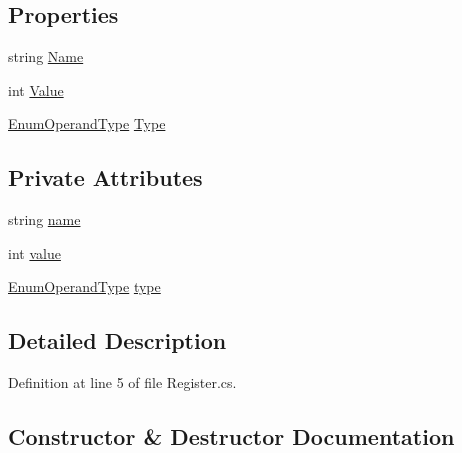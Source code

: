 \subsection*{Properties}
\begin{DoxyCompactItemize}
\item 
string \hyperlink{class_c_p_u___o_s___simulator_1_1_c_p_u_1_1_register_a75621754d2c4c740c52b6c21a8151dc4}{Name}
\item 
int \hyperlink{class_c_p_u___o_s___simulator_1_1_c_p_u_1_1_register_a1cabe4ad65d4dc6267be9f34d682e181}{Value}
\item 
\hyperlink{namespace_c_p_u___o_s___simulator_1_1_c_p_u_ad49cfe442b74115a326c03b7ae848f76}{Enum\+Operand\+Type} \hyperlink{class_c_p_u___o_s___simulator_1_1_c_p_u_1_1_register_ac9df7ddedb74ab974a57a334b42e0381}{Type}
\end{DoxyCompactItemize}
\subsection*{Private Attributes}
\begin{DoxyCompactItemize}
\item 
string \hyperlink{class_c_p_u___o_s___simulator_1_1_c_p_u_1_1_register_a1d9405f19dc212f0ff3d3307469451db}{name}
\item 
int \hyperlink{class_c_p_u___o_s___simulator_1_1_c_p_u_1_1_register_af2a05af808a3e2fa5fb086844cab1c2d}{value}
\item 
\hyperlink{namespace_c_p_u___o_s___simulator_1_1_c_p_u_ad49cfe442b74115a326c03b7ae848f76}{Enum\+Operand\+Type} \hyperlink{class_c_p_u___o_s___simulator_1_1_c_p_u_1_1_register_acb2f0f96db7cdee5c175562a5f050d83}{type}
\end{DoxyCompactItemize}


\subsection{Detailed Description}


Definition at line 5 of file Register.\+cs.



\subsection{Constructor \& Destructor Documentation}
\hypertarget{class_c_p_u___o_s___simulator_1_1_c_p_u_1_1_register_a1ee1fb682bf9349209b31a50aff2de45}{}
